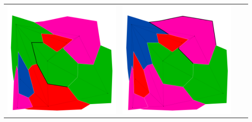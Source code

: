 \documentclass[10pt,a4paper]{article}
\begin{document}
\begin{tabular}{c c c c }
	\includegraphics[scale=.10]{../results/genetic/map_build/genetic_I00003.pdf}&
	\includegraphics[scale=.10]{../results/genetic/map_build/genetic_I00004.pdf}\\
	

\end{tabular}
\end{document}
